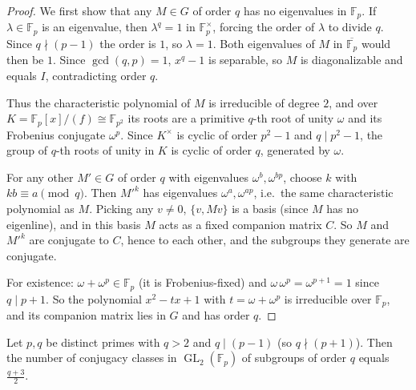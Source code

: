 \begin{proof}
We first show that any $M \in G$ of order $q$ has no eigenvalues in $\mathbb{F}_p$. If $\lambda \in \mathbb{F}_p$ is an eigenvalue, then $\lambda^q = 1$ in $\mathbb{F}_p^\times$, forcing the order of $\lambda$ to divide $q$. Since $q \nmid (p-1)$ the order is $1$, so $\lambda = 1$. Both eigenvalues of $M$ in $\overline{\mathbb{F}_p}$ would then be $1$. Since $\gcd(q,p)=1$, $x^q-1$ is separable, so $M$ is diagonalizable and equals $I$, contradicting order $q$.

Thus the characteristic polynomial of $M$ is irreducible of degree $2$, and over $K = \mathbb{F}_p[x]/(f) \cong \mathbb{F}_{p^2}$ its roots are a primitive $q$-th root of unity $\omega$ and its Frobenius conjugate $\omega^p$. Since $K^\times$ is cyclic of order $p^2-1$ and $q \mid p^2-1$, the group of $q$-th roots of unity in $K$ is cyclic of order $q$, generated by $\omega$.

For any other $M' \in G$ of order $q$ with eigenvalues $\omega^b, \omega^{bp}$, choose $k$ with $kb \equiv a \pmod q$. Then $M'^k$ has eigenvalues $\omega^a, \omega^{ap}$, i.e.\ the same characteristic polynomial as $M$. Picking any $v \ne 0$, $\{v, Mv\}$ is a basis (since $M$ has no eigenline), and in this basis $M$ acts as a fixed companion matrix $C$. So $M$ and $M'^k$ are conjugate to $C$, hence to each other, and the subgroups they generate are conjugate.

For existence: $\omega + \omega^p \in \mathbb{F}_p$ (it is Frobenius-fixed) and $\omega\,\omega^p = \omega^{p+1} = 1$ since $q \mid p+1$. So the polynomial $x^2 - tx + 1$ with $t = \omega + \omega^p$ is irreducible over $\mathbb{F}_p$, and its companion matrix lies in $G$ and has order $q$.
\end{proof}

\begin{lemma}\label{lem:case-pm1}
Let $p,q$ be distinct primes with $q > 2$ and $q \mid (p-1)$ (so $q \nmid (p+1)$). Then the number of conjugacy classes in $\operatorname{GL}_2(\mathbb{F}_p)$ of subgroups of order $q$ equals $\tfrac{q+3}{2}$.
\end{lemma}

